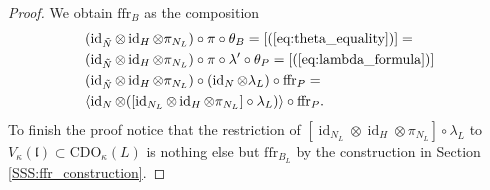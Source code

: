 \documentclass{amsart}
\theoremstyle{definition}
\newcommand{\g}{\mathfrak{g}}
\newcommand{\ffr}{\mathrm{ffr}}
\newcommand{\lf}{\mathfrak{l}}
\newcommand{\CDO}{\mathrm{CDO}}
\numberwithin{equation}{section}
\begin{document}
\begin{proof}
We obtain $\ffr_B$ as the composition 
\begin{align*}&(\operatorname{id}_{\tilde{N}}\otimes\operatorname{id}_H\otimes \pi_{N_L})\circ \pi\circ \theta_B=[(\ref{eq:theta_equality})]=\\&
(\operatorname{id}_{\tilde{N}}\otimes\operatorname{id}_H\otimes \pi_{N_L})\circ \pi\circ \lambda'\circ\theta_P=[(\ref{eq:lambda_formula})]
\\&(\operatorname{id}_{\tilde{N}}\otimes\operatorname{id}_H\otimes \pi_{N_L})\circ (\operatorname{id}_N\otimes \lambda_L)\circ \ffr_P=\\
&\langle\operatorname{id}_N\otimes ([\operatorname{id}_{N_L}\otimes\operatorname{id}_H\otimes \pi_{N_L}]\circ \lambda_L)\rangle\circ \ffr_P.
\end{align*}
To finish the proof notice that the restriction of $[\operatorname{id}_{N_L}\otimes\operatorname{id}_H\otimes \pi_{N_L}]\circ \lambda_L$ to 
$V_\kappa(\mathfrak{l})\subset \CDO_\kappa(L)$ is nothing else but $\ffr_{B_L}$ by the construction in Section \ref{SSS:ffr_construction}.
%
%
%
%
%
%
%

\end{proof}
\end{document}
